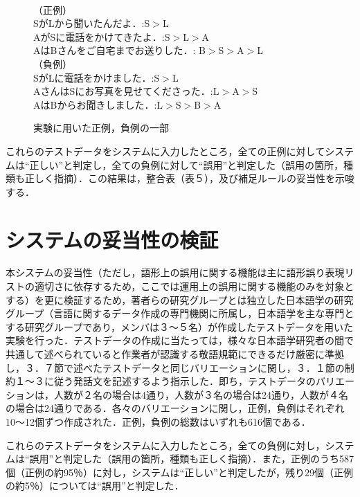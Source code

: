 \begin{figure}[htbp]
\begin{center}
\fbox
{
\begin{minipage}{80mm}
\baselineskip=4mm
　\\
（正例）\\
SがLから聞いたんだよ．:S$>$L\\
AがSに電話をかけてきたよ．:S$>$L$>$A\\
AはBさんをご自宅までお送りした．: B$>$S$>$A$>$L\\

（負例）\\
SがLに電話をかけました．:S$>$L\\
AさんはSにお写真を見せてくださった．:L$>$A$>$S\\
AはBからお聞きしました．:L$>$S$>$B$>$A\\
\end{minipage}
}
\caption{実験に用いた正例，負例の一部}
\label{fig:figure4}
\end{center}
\end{figure}


これらのテストデータをシステムに入力したところ，全ての正例に対してシステムは``正しい''と判定し，全ての負例に対して``誤用''と判定した（誤用の箇所，種類も正しく指摘）．この結果は，整合表（表５），及び補足ルールの妥当性を示唆する．

\section{システムの妥当性の検証}
本システムの妥当性（ただし，語形上の誤用に関する機能は主に語形誤り表現リストの適切さに依存するため，ここでは運用上の誤用に関する機能のみを対象とする）を更に検証するため，著者らの研究グループとは独立した日本語学の研究グループ（言語に関するデータ作成の専門機関に所属し，日本語学を主な専門とする研究グループであり，メンバは３〜５名）が作成したテストデータを用いた実験を行った．テストデータの作成に当たっては，様々な日本語学研究者の間で共通して述べられていると作業者が認識する敬語規範にできるだけ厳密に準拠し，３．７節で述べたテストデータと同じバリエーションに関し，３．１節の制約１〜３に従う発話文を記述するよう指示した．即ち，テストデータのバリエーションは，人数が２名の場合は4通り，人数が３名の場合は24通り，人数が４名の場合は24通りである．各々のバリエーションに関し，正例，負例はそれぞれ10〜12個ずつ作成された．正例，負例の総数はいずれも616個である．

これらのテストデータをシステムに入力したところ，全ての負例に対し，システムは``誤用''と判定した（誤用の箇所，種類も正しく指摘）．また，正例のうち587個（正例の約95％）に対し，システムは``正しい''と判定したが，残り29個（正例の約5％）については``誤用''と判定した．

